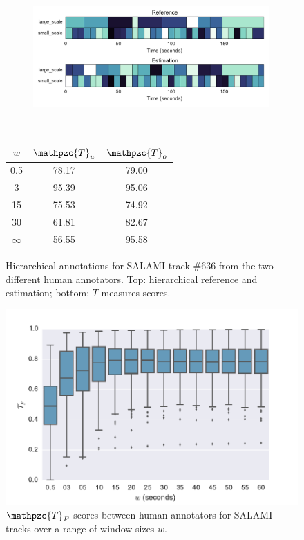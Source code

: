 \documentclass{article}
\def\shag{\ensuremath{\mathpzc{T}}}
\begin{document}
\begin{figure}[t]
  \centering
  \begin{subfigure}{0.5\textwidth}
    \centering
    \includegraphics[width=0.99\textwidth]{figs/SALAMI-SALAMI.pdf}
  \end{subfigure}%
  \\
  \begin{minipage}{0.5\textwidth}
    \centering
    \vspace{10pt}
    \begin{tabular}{|c|c|c|}
      \hline
      $w$       & $\shag_u$       & $\shag_o$      \\
      \hline
      0.5       & 78.17       & 79.00      \\     
      3         & 95.39       & 95.06      \\
      15        & 75.53       & 74.92    \\
      30        & 61.81       & 82.67    \\
      $\infty$  & 56.55       & 95.58    \\
      \hline
    \end{tabular}
  \end{minipage}
  \caption{Hierarchical annotations for SALAMI track \#636 from the two different human annotators. Top: hierarchical reference and estimation; bottom: $T$-measures scores.}
  \label{fig:SALAMI-SALAMI}
\end{figure}

\begin{figure}
    \centering
    \includegraphics[width=\columnwidth]{figs/tfw}
    \caption{$\shag_F$ scores between human annotators for SALAMI tracks over a range of window sizes $w$.\label{fig:salami-agree}}
\end{figure}
\end{document}
